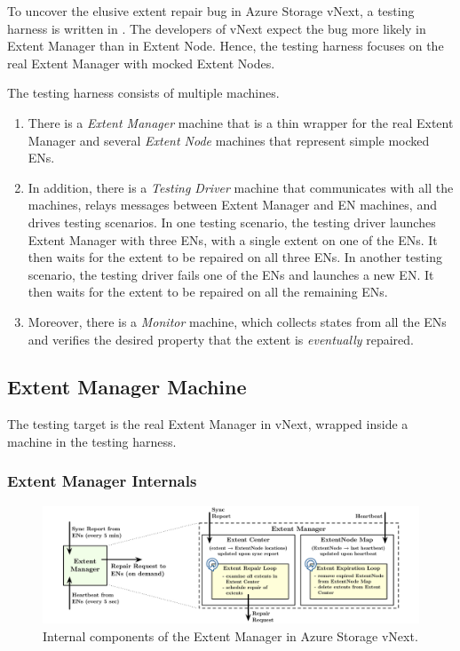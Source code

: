 To uncover the elusive extent repair bug in Azure Storage vNext, a testing harness is written in \psharp. The developers of vNext expect the bug more likely in Extent Manager than in Extent Node. Hence, the testing harness focuses on the real Extent Manager with mocked Extent Nodes.

The testing harness consists of multiple \psharp machines. 
\begin{enumerate}
\item There is a {\em Extent Manager} machine that is a thin wrapper for the real Extent Manager and several {\em Extent Node} machines that represent simple mocked ENs. 

\item In addition, there is a {\em Testing Driver} machine that communicates with all the machines, relays messages between Extent Manager and EN machines, and drives testing scenarios. In one testing scenario, the testing driver launches Extent Manager with three ENs, with a single extent on one of the ENs. It then waits for the extent to be repaired on all three ENs. In another testing scenario, the testing driver fails one of the ENs and launches a new EN. It then waits for the extent to be repaired on all the remaining ENs.

\item Moreover, there is a {\em Monitor} machine, which collects states from all the ENs and verifies the desired property that the extent is {\em eventually} repaired.
\end{enumerate}

\subsection{Extent Manager Machine}
\label{sec:method:wrap_target}

The testing target is the real Extent Manager in vNext, wrapped inside a \psharp machine in the testing harness.

\subsubsection{Extent Manager Internals}

\begin{figure}[t]
\centering
\includegraphics[width=.9\linewidth]{img/extent_manager}
\caption{Internal components of the Extent Manager in Azure Storage vNext.}
\label{fig:extentmanager}
\end{figure}

